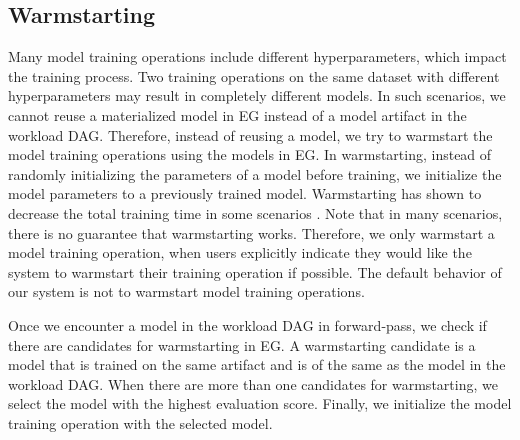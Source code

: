 \subsection{Warmstarting}
Many model training operations include different hyperparameters, which impact the training process.
Two training operations on the same dataset with different hyperparameters may result in completely different models.
In such scenarios, we cannot reuse a materialized model in EG instead of a model artifact in the workload DAG.
Therefore, instead of reusing a model, we try to warmstart the model training operations using the models in EG.
In warmstarting, instead of randomly initializing the parameters of a model before training, we initialize the model parameters to a previously trained model.
Warmstarting has shown to decrease the total training time in some scenarios \cite{baylor2017tfx}.
Note that in many scenarios, there is no guarantee that warmstarting works.
Therefore, we only warmstart a model training operation, when users explicitly indicate they would like the system to warmstart their training operation if possible.
The default behavior of our system is not to warmstart model training operations.

Once we encounter a model in the workload DAG in forward-pass, we check if there are candidates for warmstarting in EG.
A warmstarting candidate is a model that is trained on the same artifact and is of the same as the model in the workload DAG.
When there are more than one candidates for warmstarting, we select the model with the highest evaluation score.
Finally, we initialize the model training operation with the selected model.